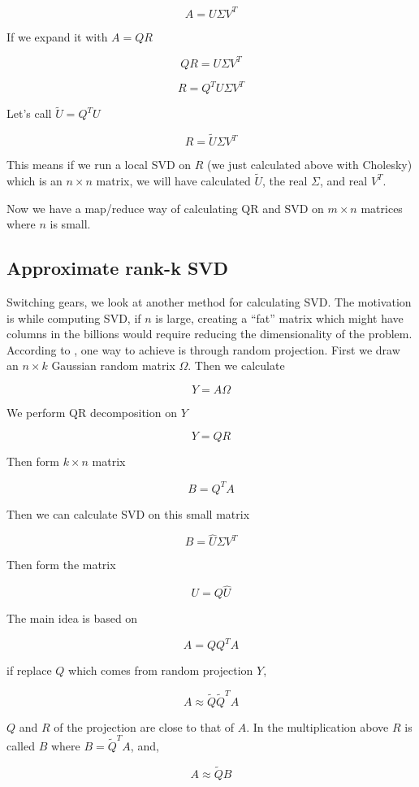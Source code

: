 \documentclass[11pt]{article}
\begin{document}
$$ A = U \Sigma V^T $$

If we expand it with $A = QR$

$$ QR =  U \Sigma V^T $$

$$ R =  Q^T U \Sigma V^T $$

Let's call $\tilde{U} = Q^T U$

$$ R =  \tilde{U} \Sigma V^T $$

This means if we run a local SVD on $R$ (we just calculated above with
Cholesky) which is an $n \times n$ matrix, we will have calculated
$\tilde{U}$, the real $\Sigma$, and real $V^T$. 

Now we have a map/reduce way of calculating QR and SVD on $m \times n$
matrices where $n$ is small.

\subsection{Approximate rank-k SVD}

Switching gears, we look at another method for calculating SVD. The
motivation is while computing SVD, if $n$ is large, creating a ``fat''
matrix which might have columns in the billions would require reducing the
dimensionality of the problem. According to \cite{halko}, one way to
achieve is through random projection. First we draw an $n \times k$
Gaussian random matrix $\Omega$. Then we calculate

$$ Y = A \Omega $$

We perform QR decomposition on $Y$

$$ Y = QR $$

Then form $k \times n$ matrix

$$ B = Q^T A \label{bt} $$

Then we can calculate SVD on this small matrix

$$ B = \hat{U} \Sigma V^T $$

Then form the matrix 

$$ U = Q \hat{U} $$

The main idea is based on

$$ A = QQ^T A $$

if replace $Q$ which comes from random projection $Y$, 

$$ A \approx \tilde{Q}\tilde{Q}^T A $$

$Q$ and $R$ of the projection are close to that of $A$. In the
multiplication above $R$ is called $B$ where $B = \tilde{Q}^T A $, and,

$$ A \approx \tilde{Q}B $$
\end{document}
